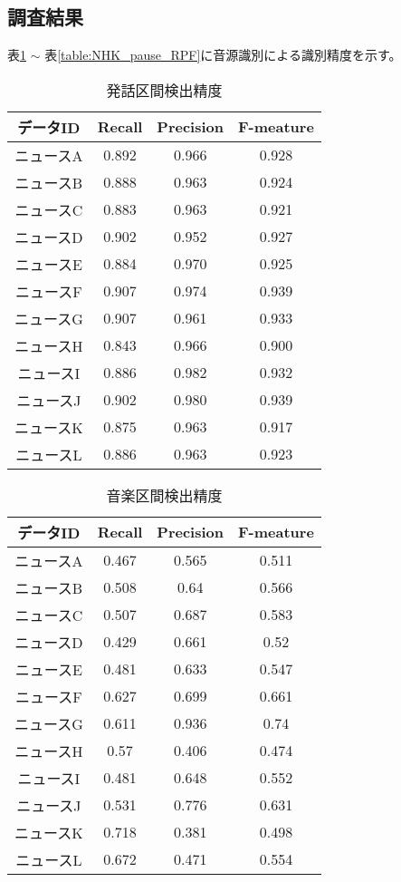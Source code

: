 \subsection{調査結果}
表\ref{table:NHK_speach_RPF} $\sim$ 表\ref{table:NHK_pause_RPF}に音源識別による識別精度を示す。
\begin{table}[H]
  \begin{center}
    \caption{発話区間検出精度 \label{table:NHK_speach_RPF}}
    \begin{tabular}{|c||c|c|c|} \hline
データID & Recall & Precision & F-meature \\ \hline
ニュースA & 0.892 & 0.966 & 0.928 \\ \hline
ニュースB & 0.888 & 0.963 & 0.924 \\ \hline
ニュースC & 0.883 & 0.963 & 0.921 \\ \hline
ニュースD & 0.902 & 0.952 & 0.927 \\ \hline
ニュースE & 0.884 & 0.970 & 0.925 \\ \hline
ニュースF & 0.907 & 0.974 & 0.939 \\ \hline
ニュースG & 0.907 & 0.961 & 0.933 \\ \hline
ニュースH & 0.843 & 0.966 & 0.900 \\ \hline
ニュースI & 0.886 & 0.982 & 0.932 \\ \hline
ニュースJ & 0.902 & 0.980 & 0.939 \\ \hline
ニュースK & 0.875 & 0.963 & 0.917 \\ \hline
ニュースL & 0.886 & 0.963 & 0.923 \\ \hline
    \end{tabular}
  \end{center}
\end{table}

\begin{table}[H]
  \begin{center}
    \caption{音楽区間検出精度 \label{table:NHK_music_RPF}}
    \begin{tabular}{|c||c|c|c|} \hline
データID & Recall & Precision & F-meature \\ \hline
ニュースA & 0.467 & 0.565 & 0.511 \\ \hline
ニュースB & 0.508 & 0.64 & 0.566 \\ \hline
ニュースC & 0.507 & 0.687 & 0.583 \\ \hline
ニュースD & 0.429 & 0.661 & 0.52 \\ \hline
ニュースE & 0.481 & 0.633 & 0.547 \\ \hline
ニュースF & 0.627 & 0.699 & 0.661 \\ \hline
ニュースG & 0.611 & 0.936 & 0.74 \\ \hline
ニュースH & 0.57 & 0.406 & 0.474 \\ \hline
ニュースI & 0.481 & 0.648 & 0.552 \\ \hline
ニュースJ & 0.531 & 0.776 & 0.631 \\ \hline
ニュースK & 0.718 & 0.381 & 0.498 \\ \hline
ニュースL & 0.672 & 0.471 & 0.554 \\ \hline
    \end{tabular}
  \end{center}
\end{table}

